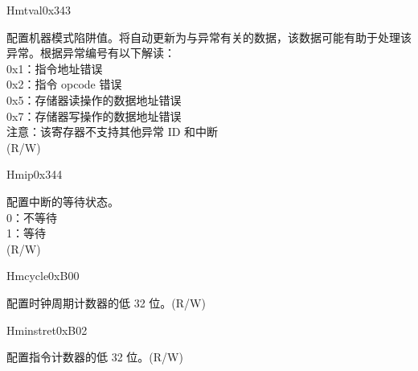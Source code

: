 \begin{register}{H}{mtval}{0x343}\label{regdesc:LPMTVAL}
%
\regnewline%
\begin{regdesc}\begin{reglist}
\label{fielddesc:LPMTVAL}\item [MTVAL] 配置机器模式陷阱值。将自动更新为与异常有关的数据，该数据可能有助于处理该异常。根据异常编号有以下解读：\\
0x1：指令地址错误\\
0x2：指令 opcode 错误\\
0x5：存储器读操作的数据地址错误\\
0x7：存储器写操作的数据地址错误\\
注意：该寄存器不支持其他异常 ID 和中断\\
(R/W)
\end{reglist}\end{regdesc}
\end{register}


\begin{register}{H}{mip}{0x344}\label{regdesc:LPMIP}
%
%
%
\regnewline%
\begin{regdesc}\begin{reglist}
\label{fielddesc:LPMIPSIP}\item [IP] 配置中断的等待状态。\\
0：不等待\\
1：等待\\
(R/W)
\end{reglist}\end{regdesc}
\end{register}

\begin{register}{H}{mcycle}{0xB00}\label{regdesc:LPMCYCLE}
%
\regnewline%
\begin{regdesc}\begin{reglist}
\label{fielddesc:LPMCYCLE}\item [MCYCLE] 配置时钟周期计数器的低 32 位。(R/W)
\end{reglist}\end{regdesc}
\end{register}

\begin{register}{H}{minstret}{0xB02}\label{regdesc:LPMINSTRET}
%
\regnewline%
\begin{regdesc}\begin{reglist}
\label{fielddesc:LPMINSTRET}\item [MINSTRET] 配置指令计数器的低 32 位。(R/W)
\end{reglist}\end{regdesc}
\end{register}


